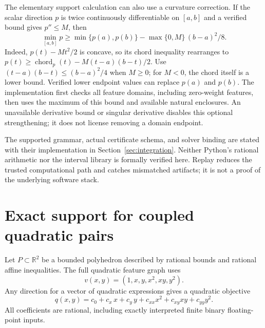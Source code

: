 \documentclass[11pt]{article}
\theoremstyle{definition}
\theoremstyle{remark}
\newcommand{\R}{\mathbb R}
\begin{document}
The elementary support calculation can also use a curvature correction.
If the scalar direction $p$ is twice continuously differentiable on
$[a,b]$ and a verified bound gives $p''\le M$, then
\begin{equation}\label{eq:chord-correction}
\min_{[a,b]}p\ge
\min\{p(a),p(b)\}-\max\{0,M\}\,(b-a)^2/8.
\end{equation}
Indeed, $p(t)-Mt^2/2$ is concave, so its chord inequality rearranges to
$p(t)\ge\operatorname{chord}_p(t)-M(t-a)(b-t)/2$.
Use $(t-a)(b-t)\le(b-a)^2/4$ when $M\ge0$; for $M<0$, the
chord itself is a lower bound. Verified lower endpoint values can
replace $p(a)$ and $p(b)$. The implementation first checks all feature
domains, including zero-weight features, then uses the maximum of this
bound and available natural enclosures. An unavailable derivative bound
or singular derivative disables this optional strengthening; it does
not license removing a domain endpoint.

The supported grammar, actual certificate schema, and solver binding
are stated with their implementation in Section~\ref{sec:integration}.
Neither Python's rational arithmetic nor the interval library is
formally verified here. Replay reduces the trusted computational path
and catches mismatched artifacts; it is not a proof of the underlying
software stack.



\section{Exact support for coupled quadratic pairs}\label{sec:polygon}

Let $P\subset\R^2$ be a bounded polyhedron described by rational bounds
and rational affine inequalities. The full quadratic feature graph uses
\[
v(x,y)=(1,x,y,x^2,xy,y^2).
\]
Any direction for a vector of quadratic expressions gives a quadratic
objective
\begin{equation}\label{eq:quadratic}
q(x,y)=c_0+c_x\,x+c_y\,y+c_{xx}x^2+c_{xy}xy+c_{yy}y^2.
\end{equation}
All coefficients are rational, including exactly interpreted finite
binary floating-point inputs.
\end{document}
